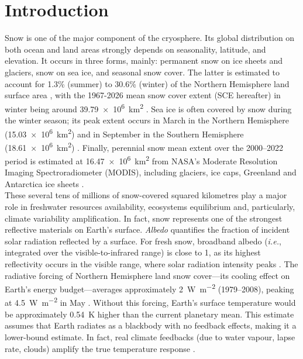 \documentclass[11pt,a4paper]{article}
\let\oldpart\part
\renewcommand{\part}[1]{%
	\oldpart{#1}%
	\markboth{\Roman{part}\quad #1}{}%
}
\newcommand{\ie}{\emph{i.e.}, }
\begin{document}
\part{Introduction}
\color{Black}
	Snow is one of the major component of the cryosphere. Its global distribution on both ocean and land areas strongly depends on seasonality, latitude, and elevation. It occurs in three forms, mainly: permanent snow on ice sheets and glaciers, snow on sea ice, and seasonal snow cover. The latter is estimated to account for 1.3\% (summer) to 30.6\% (winter) of the Northern Hemisphere land surface area \parencite{Vaughan2013}, with the 1967-2026 mean snow cover extent (SCE hereafter) in winter being around \qty{39.79e6}{\kilo\meter\squared} \parencite{rutgers_snowlab}. Sea ice is often covered by snow during the winter season; its peak extent occurs in March in the Northern Hemisphere (\qty{15.03e6}{\kilo\meter\squared}) and in September in the Southern Hemisphere (\qty{18.61e6}{\kilo\meter\squared}) \parencite{warrenSnowDepthArctic1999, fettererSeaIceIndex2025}. Finally, perennial snow mean extent over the 2000--2022 period is estimated at \qty{16.47e6}{\kilo\meter\squared} from NASA's Moderate Resolution Imaging Spectroradiometer (MODIS), including glaciers, ice caps, Greenland and Antarctica ice sheets \parencite{johnstonGlobalSnowSeasonality2024}.\\
	These several tens of millions of snow-covered squared kilometres play a major role in freshwater resources availability, ecosystems equilibrium and, particularly, climate variability amplification. In fact, snow represents one of the strongest reflective materials on Earth's surface. \emph{Albedo} quantifies the fraction of incident solar radiation reflected by a surface. For fresh snow, broadband albedo (\ie integrated over the visible-to-infrared range) is close to 1, as its highest reflectivity occurs in the visible range, where solar radiation intensity peaks \parencite{kokhanovskyScatteringOpticsSnow2004}. The radiative forcing of Northern Hemisphere land snow cover---its cooling effect on Earth's energy budget---averages approximately \qty{2}{\watt\per\meter\squared} (1979--2008), peaking at \qty{4.5}{\watt\per\meter\squared} in May \parencite{flannerRadiativeForcingAlbedo2011}. Without this forcing, Earth's surface temperature would be approximately \qty{0.54}{\kelvin} higher than the current planetary mean. This estimate assumes that Earth radiates as a blackbody with no feedback effects, making it a lower-bound estimate. In fact, real climate feedbacks (due to water vapour, lapse rate, clouds) amplify the true temperature response \parencite{croninHowWellWe2023}.
	
\end{document}
